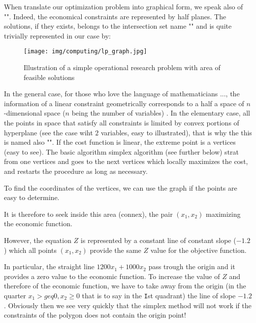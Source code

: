 	When translate our optimization problem into graphical form, we speak also of "". Indeed, the economical constraints are represented by half planes. The solutions, if they exists, belongs to the intersection set name "" and is quite trivially represented in our case by:	
	\begin{figure}[H]
		\centering
		\texttt{[image: img/computing/lp\_graph.jpg]}
		\caption{Illustration of a simple operational research problem with area of feasible solutions}
	\end{figure}
	\begin{tcolorbox}[title=Remark,colframe=black,arc=10pt]
	In the general case, for those who love the language of mathematicians ..., the information of a linear constraint geometrically corresponds to a half a space of $n$-dimensional space ($n$ being the number of variables) . In the elementary case, all the points in space that satisfy all constraints is limited by convex portions of hyperplane (see the case wiht $2$ variables, easy to illustrated), that is why the this is named also "". If the cost function is linear, the extreme point is a vertices (easy to see). The basic algorithm simplex algorithm (see further below) strat from one vertices and goes to the next vertices which locally maximizes the cost, and restarts the procedure as long as necessary.
	\end{tcolorbox}	
	To find the coordinates of the vertices, we can use the graph if the points are easy to determine.

	It is therefore to seek inside this area (connex), the pair  $(x_1,x_2)$ maximizing the economic function.

	However, the equation $Z$ is represented by a constant line of constant slope ($-1.2$) which all points $(x_1,x_2)$ provide the same $Z$ value for the objective function.
	
	In particular, the straight line $1200x_1+1000x_2$ pass trough the origin and it provides a zero value to the economic function. To increase the value of $Z$ and therefore of the economic function, we have to take away from the origin (in the quarter $x_1>geq 0,x_2\geq 0$ that is to say in the \texttt{I}st quadrant) the line of slope $-1.2$. Obviously then we see very quickly that the simplex method will not work if the constraints of the polygon does not contain the origin point!
	
